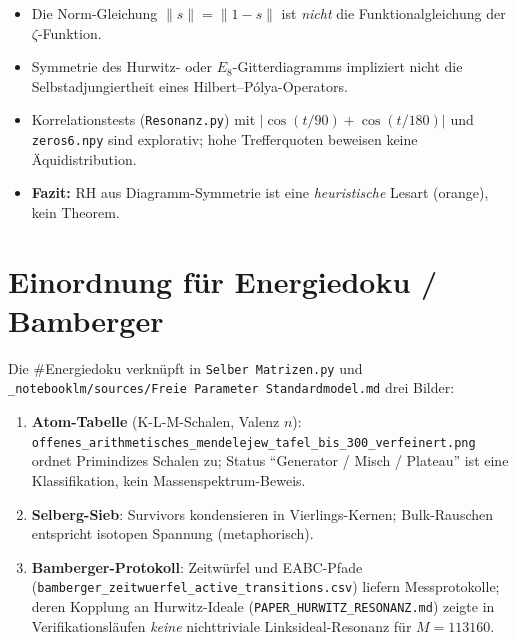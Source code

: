 \documentclass[12pt,a4paper]{article}
\begin{document}
\begin{tcolorbox}[heuristik,title={Wichtig: kein Beweis der RH}]
\begin{itemize}[nosep]
  \item Die Norm-Gleichung $\|s\|=\|1-s\|$ ist \emph{nicht} die
        Funktionalgleichung der $\zeta$-Funktion.
  \item Symmetrie des Hurwitz- oder $E_8$-Gitterdiagramms impliziert
        nicht die Selbstadjungiertheit eines Hilbert--Pólya-Operators.
  \item Korrelationstests (\texttt{Resonanz.py}) mit
        $|{\cos(t/90)+\cos(t/180)}|$ und \texttt{zeros6.npy}
        sind explorativ; hohe Trefferquoten beweisen keine
        Äquidistribution.
  \item \textbf{Fazit:} RH aus Diagramm-Symmetrie ist eine
        \emph{heuristische} Lesart (orange), kein Theorem.
\end{itemize}
\end{tcolorbox}

\section{Einordnung für Energiedoku / Bamberger}
\label{sec:bamberg}

Die \#Energiedoku verknüpft in \texttt{Selber Matrizen.py} und
\texttt{\_notebooklm/sources/Freie Parameter Standardmodel.md}
drei Bilder:
\begin{enumerate}[nosep]
  \item \textbf{Atom-Tabelle} (K-L-M-Schalen, Valenz $n$):
        \texttt{offenes\_arithmetisches\_mendelejew\_tafel\_bis\_300\_verfeinert.png}
        ordnet Primindizes Schalen zu; Status ``Generator / Misch / Plateau''
        ist eine Klassifikation, kein Massenspektrum-Beweis.
  \item \textbf{Selberg-Sieb}: Survivors kondensieren in Vierlings-Kernen;
        Bulk-Rauschen entspricht isotopen Spannung (metaphorisch).
  \item \textbf{Bamberger-Protokoll}: Zeitwürfel und EABC-Pfade
        (\texttt{bamberger\_zeitwuerfel\_active\_transitions.csv})
        liefern Messprotokolle; deren Kopplung an Hurwitz-Ideale
        (\texttt{PAPER\_HURWITZ\_RESONANZ.md}) zeigte in Verifikationsläufen
        \emph{keine} nichttriviale Linksideal-Resonanz für $M=113160$.
\end{enumerate}
\end{document}
